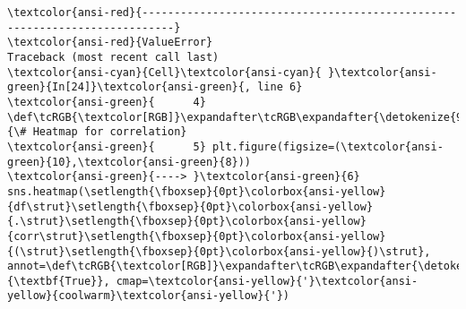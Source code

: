 \documentclass[11pt]{article}
\begin{document}
    \begin{Verbatim}[commandchars=\\\{\}, frame=single, framerule=2mm, rulecolor=\color{outerrorbackground}]
\textcolor{ansi-red}{---------------------------------------------------------------------------}
\textcolor{ansi-red}{ValueError}                                Traceback (most recent call last)
\textcolor{ansi-cyan}{Cell}\textcolor{ansi-cyan}{ }\textcolor{ansi-green}{In[24]}\textcolor{ansi-green}{, line 6}
\textcolor{ansi-green}{      4} \def\tcRGB{\textcolor[RGB]}\expandafter\tcRGB\expandafter{\detokenize{95,135,135}}{\# Heatmap for correlation}
\textcolor{ansi-green}{      5} plt.figure(figsize=(\textcolor{ansi-green}{10},\textcolor{ansi-green}{8}))
\textcolor{ansi-green}{----> }\textcolor{ansi-green}{6} sns.heatmap(\setlength{\fboxsep}{0pt}\colorbox{ansi-yellow}{df\strut}\setlength{\fboxsep}{0pt}\colorbox{ansi-yellow}{.\strut}\setlength{\fboxsep}{0pt}\colorbox{ansi-yellow}{corr\strut}\setlength{\fboxsep}{0pt}\colorbox{ansi-yellow}{(\strut}\setlength{\fboxsep}{0pt}\colorbox{ansi-yellow}{)\strut}, annot=\def\tcRGB{\textcolor[RGB]}\expandafter\tcRGB\expandafter{\detokenize{0,135,0}}{\textbf{True}}, cmap=\textcolor{ansi-yellow}{'}\textcolor{ansi-yellow}{coolwarm}\textcolor{ansi-yellow}{'})


\end{Verbatim}
\end{document}
